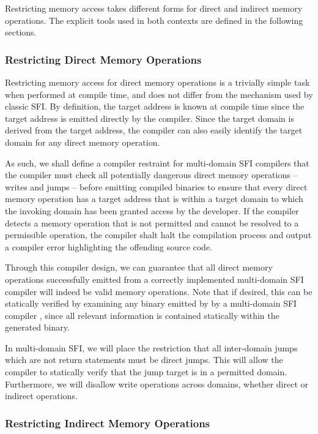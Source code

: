 \documentclass[12pt]{article}
\begin{document}
Restricting memory access takes different forms for direct and indirect memory operations. The explicit tools used in both contexts are defined in the following sections.

\subsubsection{Restricting Direct Memory Operations}

Restricting memory access for direct memory operations is a trivially simple task when performed at compile time, and does not differ from the mechanism used by classic SFI. By definition, the target address is known at compile time since the target address is emitted directly by the compiler. Since the target domain is derived from the target address, the compiler can also easily identify the target domain for any direct memory operation.

As such, we shall define a compiler restraint for multi-domain SFI compilers that the compiler must check all potentially dangerous direct memory operations -- writes and jumps -- before emitting compiled binaries to ensure that every direct memory operation has a target address that is within a target domain to which the invoking domain has been granted access by the developer. If the compiler detects a memory operation that is not permitted and cannot be resolved to a permissible operation, the compiler shalt halt the compilation process and output a compiler error highlighting the offending source code.

Through this compiler design, we can guarantee that all direct memory operations successfully emitted from a correctly implemented multi-domain SFI compiler will indeed be valid memory operations. Note that if desired, this can be statically verified by examining any binary emitted by by a multi-domain SFI compiler \cite{yee_native_2009}, since all relevant information is contained statically within the generated binary.

In multi-domain SFI, we will place the restriction that all inter-domain jumps which are not return statements must be direct jumps. This will allow the compiler to statically verify that the jump target is in a permitted domain. Furthermore, we will disallow write operations across domains, whether direct or indirect operations.

\subsubsection{Restricting Indirect Memory Operations}
\end{document}
